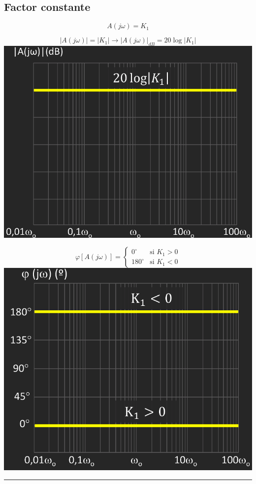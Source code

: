 \documentclass{article}
\begin{document}
\subsection{Factor constante}
$$
A (j \omega) = K_{1}
$$
\begin{minipage}{0.49\textwidth}
$$
|A (j \omega)| = |K_{1}| \to |A (j \omega)|_{dB} = 20 \log |K_{1}|
$$
    \centering
    \includegraphics[width=\textwidth]{figbode21.jpg} 
\end{minipage}
\begin{minipage}{0.49\textwidth}
	$$
\varphi [A (j \omega)] = 
\begin{cases}
0^\circ & \text{si } K_{1} > 0 \\
180^\circ & \text{si } K_{1} < 0 
\end{cases}
	$$
    \centering
    \includegraphics[width=\textwidth]{figbode211.jpg} 
\end{minipage}
\hrule
\end{document}
